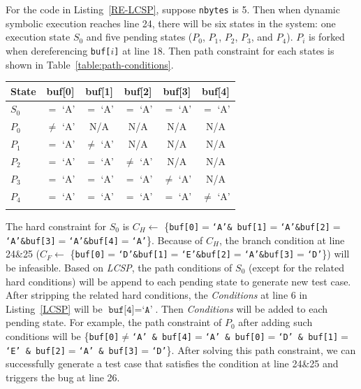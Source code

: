 For the code in Listing~\ref{RE-LCSP}, suppose \texttt{nbytes} is 5. 
Then when dynamic symbolic execution reaches line 24, there will be 
six states in the system: one execution state $S_0$ and five pending 
states ($P_0$, $P_1$, $P_2$, $P_3$, and $P_4$). $P_i$ is forked when 
dereferencing \texttt{buf[$i$]} at line 18.
Then path constraint for each states is shown in Table~\ref{table:path-conditions}.

\begin{table}[!b]
{\begin{tabular*}{20pc}{@{\extracolsep{\fill}}lccccc@{}}\toprule
State  & buf[0] & buf[1] & buf[2] & buf[3] & buf[4]\\ 
\midrule
		$S_0$  &  $=$ `A' & $=$ `A' & $=$ `A' & $=$ `A' & $=$ `A' \\
		$P_0$  &  $\neq$ `A' & N/A & N/A & N/A & N/A \\
		$P_1$  &  $=$ `A' & $\neq$ `A' & N/A & N/A & N/A\\
		$P_2$  &  $=$ `A' & $=$ `A' & $\neq$ `A' & N/A & N/A \\
		$P_3$  &  $=$ `A' & $=$ `A' & $=$ `A' & $\neq$ `A' & N/A \\
		$P_4$  &  $=$ `A' & $=$ `A' & $=$ `A' & $=$ `A' & $\neq$ `A' \\
\botrule
\end{tabular*}}{}
\end{table}

The hard constraint for $S_0$ is $C_{H}\leftarrow$ \{\texttt{buf[0]$=$`A'\& buf[1]$=$`A'\&buf[2]$=$`A'\&buf[3]$=$`A'\&buf[4]$=$`A'}\}. 
Because of $C_{H}$, the branch condition at line 24\&25 ($C_{F}\leftarrow$ \{\texttt{buf[0]$=$`D'\&buf[1]$=$`E'\&buf[2]$=$`A'\&buf[3]$=$`D'}\}) will 
be infeasible.
Based on \textit{LCSP}, the path conditions of $S_0$ (except for the related 
hard conditions) will be append to each pending state to generate new test case. 
After stripping the related hard conditions, the \textit{Conditions} at line 
6 in Listing~\ref{LCSP} will be $\texttt{buf[4]}=\texttt{`A'}$. 
Then \textit{Conditions} will be added to each pending state. For example, 
the path constraint of $P_0$ after adding such conditions will be 
\{\texttt{buf[0]$\neq$`A' \& buf[4]$=$`A' \& buf[0]$=$`D' \& buf[1]$=$`E' \& buf[2]$=$`A' \& buf[3]$=$`D'}\}. After solving this path constraint, we can successfully 
generate a test case that satisfies the condition at line 24\&25 and 
triggers the bug at line 26. 

